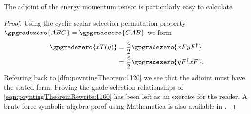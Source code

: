 
The adjoint of the energy momentum tensor is particularly easy to calculate.
\begin{proof}
Using
the cyclic scalar selection permutation property \(\gpgradezero{ABC} = \gpgradezero{CAB}\) we form
\begin{equation}\label{eqn:poyntingTheoremRewrite:1160}
\begin{aligned}
\gpgradezero{ x T(y) }
&= \frac{\epsilon}{2} \gpgradezero{ x F y F^\dagger } \\
&= \frac{\epsilon}{2} \gpgradezero{ y F^\dagger x F }.
\end{aligned}
\end{equation}
Referring back to \cref{dfn:poyntingTheorem:1120} we see that the adjoint must have the stated form.
Proving the grade selection relationships of \cref{eqn:poyntingTheoremRewrite:1160} has been left as
an exercise for the reader.  A brute force symbolic algebra proof using Mathematica is also available in .
\end{proof}

